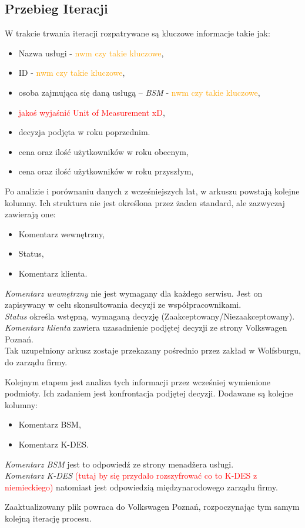 \subsection{Przebieg Iteracji}
W trakcie trwania iteracji rozpatrywane są kluczowe informacje takie jak:
\begin{itemize}
\item Nazwa usługi - \textcolor{orange}{nwm czy takie kluczowe},
\item ID - \textcolor{orange}{nwm czy takie kluczowe},
\item osoba zajmująca się daną usługą -- \emph{BSM} - \textcolor{orange}{nwm czy takie kluczowe},
\item \textcolor{red}{jakoś wyjaśnić Unit of Measurement xD},
\item decyzja podjęta w roku poprzednim.
\item cena oraz ilość użytkowników w roku obecnym,
\item cena oraz ilość użytkowników w roku przyszłym,
\end{itemize}
Po analizie i porównaniu danych z wcześniejszych lat, w arkuszu powstają kolejne kolumny. Ich struktura nie jest określona przez żaden standard, ale zazwyczaj zawierają one:
\begin{itemize}
\item Komentarz wewnętrzny,
\item Status,
\item Komentarz klienta.
\end{itemize}

\noindent\emph{Komentarz wewnętrzny} nie jest wymagany dla każdego serwisu. Jest on zapisywany w celu skonsultowania decyzji ze współpracownikami.\\ \emph{Status} określa wstępną, wymaganą decyzję (Zaakceptowany/Niezaakceptowany).\\ \emph{Komentarz klienta} zawiera uzasadnienie podjętej decyzji ze strony Volkswagen Poznań.\\Tak uzupełniony arkusz zostaje przekazany pośrednio przez zakład w Wolfsburgu, do zarządu firmy. \par
Kolejnym etapem jest analiza tych informacji przez wcześniej wymienione podmioty. Ich zadaniem jest konfrontacja podjętej decyzji. Dodawane są kolejne kolumny:
\begin{itemize}
    \item Komentarz BSM,
    \item Komentarz K-DES.
\end{itemize}

\noindent\emph{Komentarz BSM} jest to odpowiedź ze strony menadżera usługi.\\ \emph{Komentarz K-DES} \textcolor{red}{(tutaj by się przydało rozszyfrować co to K-DES z niemieckiego)} natomiast jest odpowiedzią międzynarodowego zarządu firmy.\par
Zaaktualizowany plik powraca do Volkswagen Poznań, rozpoczynając tym samym kolejną iterację procesu.





